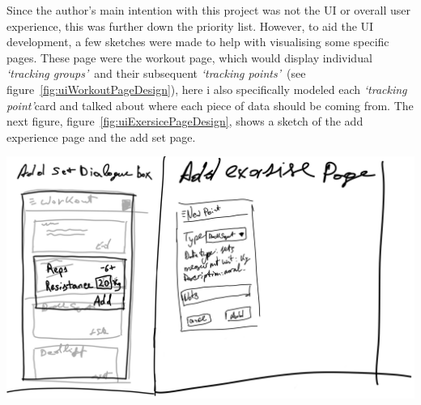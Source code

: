 \documentclass{article}
\newcommand{\tp}{\textit{`tracking point'}}
\newcommand{\tps}{\textit{`tracking points'}}
\newcommand{\tgs}{\textit{`tracking groups'}}
\begin{document}
\begin{multicols}{2}
Since the author's main intention with this project was not the UI or overall user experience, this was further down the priority list. However, to aid the UI development, a few sketches were made to help with visualising some specific pages. These page were the workout page, which would display individual \tgs~and their subsequent \tps~(see figure~\ref{fig:uiWorkoutPageDesign}), here i also specifically modeled each \tp card and talked about where each piece of data should be coming from. The next figure, figure~\ref{fig:uiExersicePageDesign}, shows a sketch of the add experience page and the add set page. 

\begingroup
\centering
\includegraphics[width=0.9\linewidth]{./appendix/assets/img/uiDesigns/excersisePage.jpg}
~\label{fig:uiExersicePageDesign}
\endgroup
\begingroup
\centering

\end{multicols}
\end{document}
